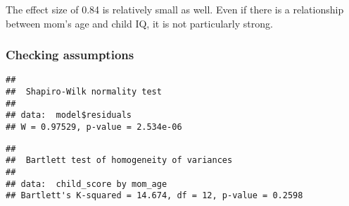 \documentclass[
]{article}
\newenvironment{Shaded}{\begin{snugshade}}{\end{snugshade}}
\newcommand{\AttributeTok}[1]{\textcolor[rgb]{0.77,0.63,0.00}{#1}}
\newcommand{\CommentTok}[1]{\textcolor[rgb]{0.56,0.35,0.01}{\textit{#1}}}
\newcommand{\ConstantTok}[1]{\textcolor[rgb]{0.00,0.00,0.00}{#1}}
\newcommand{\DecValTok}[1]{\textcolor[rgb]{0.00,0.00,0.81}{#1}}
\newcommand{\FunctionTok}[1]{\textcolor[rgb]{0.00,0.00,0.00}{#1}}
\newcommand{\NormalTok}[1]{#1}
\newcommand{\SpecialCharTok}[1]{\textcolor[rgb]{0.00,0.00,0.00}{#1}}
\newcommand{\StringTok}[1]{\textcolor[rgb]{0.31,0.60,0.02}{#1}}
\begin{document}
The effect size of 0.84 is relatively small as well. Even if there is a
relationship between mom's age and child IQ, it is not particularly
strong.

\hypertarget{checking-assumptions}{%
\subsubsection{Checking assumptions}\label{checking-assumptions}}

\begin{Shaded}
\end{Shaded}

\begin{verbatim}
## 
##  Shapiro-Wilk normality test
## 
## data:  model$residuals
## W = 0.97529, p-value = 2.534e-06
\end{verbatim}

\begin{Shaded}
\end{Shaded}

\begin{verbatim}
## 
##  Bartlett test of homogeneity of variances
## 
## data:  child_score by mom_age
## Bartlett's K-squared = 14.674, df = 12, p-value = 0.2598
\end{verbatim}
\end{document}

